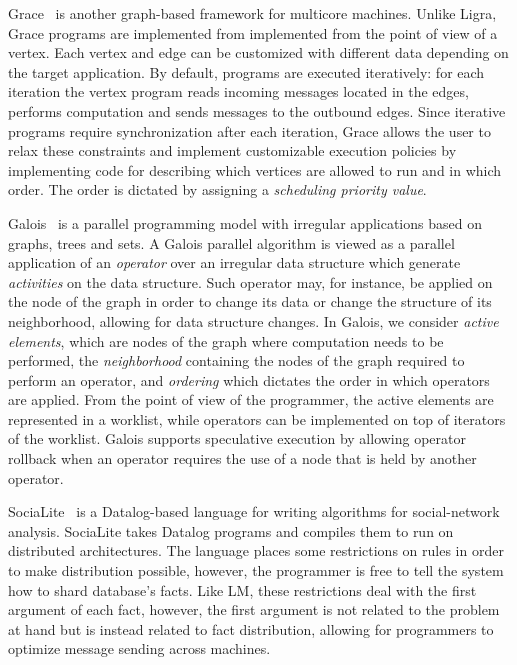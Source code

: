 Grace~\cite{wang:asynchronous} is another graph-based framework for multicore
machines. Unlike Ligra, Grace programs are implemented from implemented from the
point of view of a vertex. Each vertex and edge can be customized with different
data depending on the target application. By default, programs are executed
iteratively: for each iteration the vertex program reads incoming messages
located in the edges, performs computation and sends messages to the outbound
edges. Since iterative programs require synchronization after each iteration,
Grace allows the user to relax these constraints and implement customizable
execution policies by implementing code for describing which vertices are
allowed to run and in which order. The order is dictated by assigning a
\emph{scheduling priority value}.

Galois~\cite{Pingali:2011:TPA:1993316.1993501} is a parallel programming model
with irregular applications based on graphs, trees and sets. A Galois parallel
algorithm is viewed as a parallel application of an \emph{operator} over an
irregular data structure which generate \emph{activities} on the data structure.
Such operator may, for instance, be applied on the node of the graph in order to
change its data or change the structure of its neighborhood, allowing for data
structure changes. In Galois, we consider \emph{active elements}, which are
nodes of the graph where computation needs to be performed, the
\emph{neighborhood} containing the nodes of the graph required to perform an
operator, and \emph{ordering} which dictates the order in which operators are
applied. From the point of view of the programmer, the active elements are
represented in a worklist, while operators can be implemented on top of
iterators of the worklist. Galois supports speculative execution by allowing
operator rollback when an operator requires the use of a node that is held by
another operator.

SociaLite~\cite{Seo:2013:DSD:2556549.2556572} is a Datalog-based language for
writing algorithms for social-network analysis. SociaLite takes Datalog programs
and compiles them to run on distributed architectures. The language places some
restrictions on rules in order to make distribution possible, however, the
programmer is free to tell the system how to shard database's facts. Like LM, these
restrictions deal with the first argument of each fact, however, the first
argument is not related to the problem at hand but is instead related to fact
distribution, allowing for programmers to optimize message sending across
machines.


